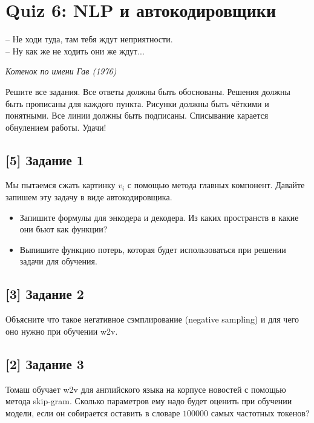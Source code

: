 \documentclass[12pt, a4paper, oneside]{article}
\begin{document}
\section*{Quiz 6: NLP и автокодировщики}

\epigraph{ -- Не ходи туда, там тебя ждут неприятности. \\ -- Ну как же не ходить они же ждут...}{\textit{Котенок по имени Гав (1976)}}

Решите все задания. Все ответы должны быть обоснованы. Решения должны быть прописаны для каждого пункта. Рисунки должны быть чёткими и понятными. Все линии должны быть подписаны. Списывание карается обнулением работы.  Удачи! 

\vspace{-0.5cm}
\subsection*{[5] Задание 1}
\vspace{-0.5cm}
Мы пытаемся сжать картинку $v_i$ с помощью метода главных компонент. Давайте запишем эту задачу в виде автокодировщика. 
\begin{itemize} 
    \item Запишите формулы для энкодера и декодера. Из каких пространств в какие они бьют как функции? 
    \item Выпишите функцию потерь, которая будет использоваться при решении задачи для обучения. 
\end{itemize} 

\vspace{-0.5cm}
\subsection*{[3] Задание 2}
\vspace{-0.5cm}
Объясните что такое негативное сэмплирование (negative sampling) и для чего оно нужно при обучении w2v.

\vspace{-0.5cm}
\subsection*{[2] Задание 3}
\vspace{-0.5cm}
Томаш обучает w2v для английского языка на корпусе новостей с помощью метода skip-gram. Сколько параметров ему надо будет оценить при обучении модели, если он собирается оставить в словаре $100 000$ самых частотных токенов? 
\end{document}

